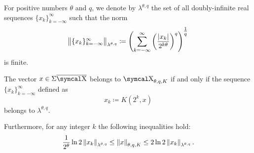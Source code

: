 \begin{definition}\label{def:discrete_k_interpolation_space}
  For positive numbers \( \theta \) and \( q \), we denote by \( \lambda^{\theta,q} \) the set of all doubly-infinite real sequences \( \{ x_k \}_{k=-\infty}^\infty \) such that the norm
  \begin{equation}\label{def:discrete_k_interpolation_space}
    \left\Vert \{ x_k \}_{k=-\infty}^\infty \right\Vert_{\lambda^{\theta,q}} \coloneqq \left( \sum_{k=-\infty}^\infty \left( \frac {\left\vert x_k \right\vert} {2^{k\theta}} \right)^q \right)^{\tfrac 1 q}
  \end{equation}
  is finite.
\end{definition}

\begin{theorem}\label{thm:discrete_k_interpolation}
  The vector \( x \in \Sigma\Ol{\CX} \) belongs to \hyperref[def:k_functional_interpolation_space]{\( \CX_{\theta,q,K} \)} if and only if the sequence \( \{ x_k \}_{k=-\infty}^\infty \) defined as
  \begin{equation}\label{eq:thm:discrete_k_interpolation/sequence}
    x_k \coloneqq K(2^k, x)
  \end{equation}
  belongs to \hyperref[def:discrete_k_interpolation_space]{\( \lambda^{\theta,q} \)}.

  Furthermore, for any integer \( k \) the following inequalities hold:
  \begin{equation}\label{eq:thm:discrete_k_interpolation/inequalities}
    \frac 1 {2^\theta} \ln 2 \left\Vert x_k \right\Vert_{\lambda^{\theta,q}}
    \leq
    \left\Vert x \right\Vert_{\theta,q,K}
    \leq
    2 \ln 2 \left\Vert x_k \right\Vert_{\lambda^{\theta,q}}.
  \end{equation}
\end{theorem}
